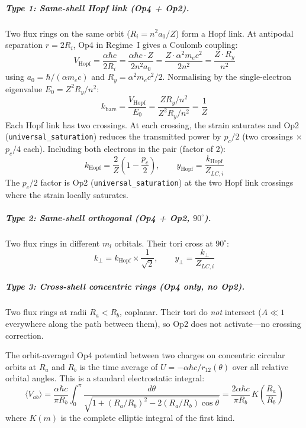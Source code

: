 \subparagraph{Type 1: Same-shell Hopf link (Op4 + Op2).}
Two flux rings on the same orbit ($R_i = n^2 a_0 / Z$) form
a Hopf link.  At antipodal separation $r = 2R_i$, Op4 in
Regime~I gives a Coulomb coupling:
\begin{equation}
    V_{\text{Hopf}} = \frac{\alpha\hbar c}{2 R_i}
    = \frac{\alpha\hbar c \cdot Z}{2 n^2 a_0}
    = \frac{Z \cdot \alpha^2 m_e c^2}{2 n^2}
    = \frac{Z \cdot R_y}{n^2}
\end{equation}
using $a_0 = \hbar/(\alpha m_e c)$ and $R_y = \alpha^2 m_e c^2/2$.
Normalising by the single-electron eigenvalue $E_0 = Z^2 R_y/n^2$:
\begin{equation}
    k_{\text{bare}} = \frac{V_{\text{Hopf}}}{E_0}
    = \frac{Z R_y / n^2}{Z^2 R_y / n^2} = \frac{1}{Z}
\end{equation}
Each Hopf link has two crossings.  At each crossing, the strain
saturates and Op2 (\texttt{universal\_saturation}) reduces the
transmitted power by $p_c/2$ (two crossings $\times$ $p_c/4$ each).
Including both electrons in the pair (factor of 2):
\begin{equation}
    k_{\text{Hopf}} = \frac{2}{Z}\left(1 - \frac{p_c}{2}\right),
    \qquad y_{\text{Hopf}} = \frac{k_{\text{Hopf}}}{Z_{LC,i}}
    \label{eq:y_hopf}
\end{equation}
The $p_c/2$ factor is Op2 (\texttt{universal\_saturation}) at the
two Hopf link crossings where the strain locally saturates.

\subparagraph{Type 2: Same-shell orthogonal (Op4 + Op2, $90^\circ$).}
Two flux rings in different $m_l$ orbitals. Their tori cross
at $90^\circ$:
\begin{equation}
    k_\perp = k_{\text{Hopf}} \times \frac{1}{\sqrt{2}},
    \qquad y_\perp = \frac{k_\perp}{Z_{LC,i}}
    \label{eq:y_perp}
\end{equation}

\subparagraph{Type 3: Cross-shell concentric rings (Op4 only, no Op2).}
Two flux rings at radii $R_a < R_b$, coplanar. Their tori do
\emph{not} intersect ($A \ll 1$ everywhere along the path between
them), so Op2 does not activate---no crossing correction.

The orbit-averaged Op4 potential between two charges on
concentric circular orbits at $R_a$ and $R_b$ is the
time average of $U = -\alpha\hbar c / r_{12}(\theta)$
over all relative orbital angles.  This is a standard
electrostatic integral:
\begin{equation}
    \langle V_{ab} \rangle
    = \frac{\alpha\hbar c}{\pi R_b}
    \int_0^\pi
    \frac{d\theta}{\sqrt{1 + (R_a/R_b)^2 - 2(R_a/R_b)\cos\theta}}
    = \frac{2\alpha\hbar c}{\pi R_b}\,
    K\!\left(\frac{R_a}{R_b}\right)
    \label{eq:ring_coulomb}
\end{equation}
where $K(m)$ is the complete elliptic integral of the first kind.

